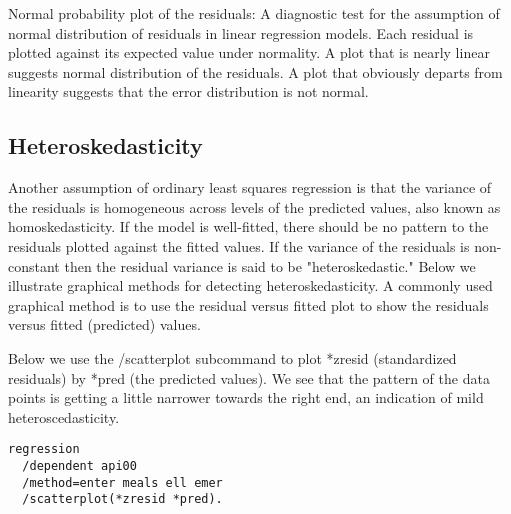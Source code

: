 Normal probability plot of the residuals: A diagnostic test for the assumption of normal distribution of residuals in linear regression models. Each residual is plotted against its expected value under normality. A plot that is nearly linear suggests normal distribution of the residuals. A plot that obviously departs from linearity suggests that the error distribution is not normal.

\subsection{Heteroskedasticity}

Another assumption of ordinary least squares regression is that the variance of the residuals is homogeneous across levels of the predicted values, also known as homoskedasticity. If the model is well-fitted, there should be no pattern to the residuals plotted against the fitted values. If the variance of the residuals is non-constant then the residual variance is said to be "heteroskedastic." Below we illustrate graphical methods for detecting heteroskedasticity. A commonly used graphical method is to use the residual versus fitted plot to show the residuals versus fitted (predicted) values.

Below we use the /scatterplot subcommand to plot *zresid (standardized residuals) by *pred (the predicted values).  We see that the pattern of the data points is getting a little narrower towards the right end, an indication of mild heteroscedasticity.

\begin{verbatim}
regression
  /dependent api00
  /method=enter meals ell emer
  /scatterplot(*zresid *pred).
\end{verbatim}


